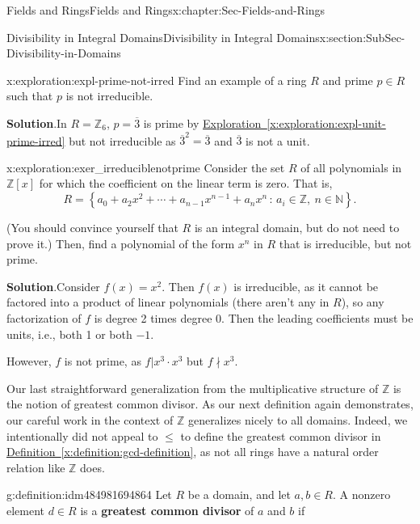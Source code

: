 \documentclass[oneside,10pt,]{book}
\newcommand{\blocktitlefont}{\relax}
\newcommand{\xreffont}{\relax}
\newcommand{\terminology}[1]{\textbf{#1}}
\numberwithin{equation}{section}
\renewcommand{\le}{\leqslant}
\newcommand{\setof}[2]{{\left\{#1\,\colon\,#2\right\}}}
\def\Z{{\mathbb Z}}
\def\N{{\mathbb N}}
\begin{document}
\begin{chapterptx}{Fields and Rings}{}{Fields and Rings}{}{}{x:chapter:Sec-Fields-and-Rings}
\begin{sectionptx}{Divisibility in Integral Domains}{}{Divisibility in Integral Domains}{}{}{x:section:SubSec-Divisibility-in-Domains}
\begin{exploration}{}{x:exploration:expl-prime-not-irred}
Find an example of a ring \(R\) and prime \(p\in R\) such that \(p\) is not irreducible.%
\par\smallskip%
\noindent\textbf{\blocktitlefont Solution}.\hypertarget{g:solution:idm484981708000}{}\quad{}In \(R = \Z_6\), \(p = \overline{3}\) is prime by \hyperref[x:exploration:expl-unit-prime-irred]{Exploration~{\xreffont\ref{x:exploration:expl-unit-prime-irred}}} but not irreducible as \(\overline{3}^2 = \overline{3}\) and \(\overline{3}\) is not a unit.%
\end{exploration}
\begin{exploration}{}{x:exploration:exer_irreduciblenotprime}%
Consider the set \(R\) of all polynomials in \(\Z[x]\) for which the coefficient on the linear term is zero. That is,%
\begin{equation*}
R = \setof{a_0 + a_2 x^2 + \cdots + a_{n-1} x^{n-1} + a_n x^n}{a_i\in \Z,\ n\in\N}\text{.}
\end{equation*}
%
\par
(You should convince yourself that \(R\) is an integral domain, but do not need to prove it.) Then, find a polynomial of the form \(x^n\) in \(R\) that is irreducible, but not prime.%
\par\smallskip%
\noindent\textbf{\blocktitlefont Solution}.\hypertarget{g:solution:idm484981699392}{}\quad{}Consider \(f(x) = x^2\). Then \(f(x)\) is irreducible, as it cannot be factored into a product of linear polynomials (there aren't any in \(R\)), so any factorization of \(f\) is degree 2 times degree 0. Then the leading coefficients must be units, i.e., both 1 or both \(-1\).%
\par
However, \(f\) is not prime, as \(f| x^3 \cdot x^3\) but \(f\nmid x^3\).%
\end{exploration}
Our last straightforward generalization from the multiplicative structure of \(\Z\) is the notion of greatest common divisor. As our next definition again demonstrates, our careful work in the context of \(\Z\) generalizes nicely to all domains. Indeed, we intentionally did not appeal to \(\le\) to define the greatest common divisor in \hyperref[x:definition:gcd-definition]{Definition~{\xreffont\ref{x:definition:gcd-definition}}}, as not all rings have a natural order relation like \(\Z\) does.%
\begin{definition}{}{g:definition:idm484981694864}%
%
Let \(R\) be a domain, and let \(a,b\in R\). A nonzero element \(d\in R\) is a \terminology{greatest common divisor} of \(a\) and \(b\) if%
\begin{enumerate}

\end{enumerate}
\end{definition}
\end{sectionptx}
\end{chapterptx}
\end{document}
